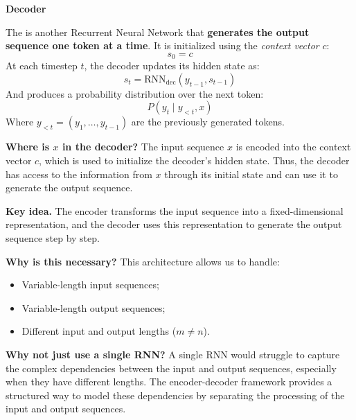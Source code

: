 \highspace
\begin{flushleft}
    \textcolor{Green3}{ \textbf{Decoder}}
\end{flushleft}
The  is another Recurrent Neural Network that \textbf{generates the output sequence one token at a time}. It is initialized using the \emph{context vector} $c$:
\begin{equation*}
    s_{0} = c
\end{equation*}
At each timestep $t$, the decoder updates its hidden state as:
\begin{equation}\label{eq:decoder}
    s_{t} = \text{RNN}_{\text{dec}}\left(y_{t-1}, s_{t-1}\right)
\end{equation}
And produces a probability distribution over the next token:
\begin{equation*}
    P\left(y_t \mid y_{<t}, x\right)
\end{equation*}
Where $y_{<t} = \left(y_1, \dots, y_{t-1}\right)$ are the previously generated tokens.

\highspace
\textcolor{Green3}{ \textbf{Where is $x$ in the decoder?}} The input sequence $x$ is encoded into the context vector $c$, which is used to initialize the decoder's hidden state. Thus, the decoder has access to the information from $x$ through its initial state and can use it to generate the output sequence.

\highspace
\textcolor{Green3}{ \textbf{Key idea.}} The encoder transforms the input sequence into a fixed-dimensional representation, and the decoder uses this representation to generate the output sequence step by step.

\highspace
\textcolor{Green3}{ \textbf{Why is this necessary?}} This architecture allows us to handle:
\begin{itemize}
    \item Variable-length input sequences;
    \item Variable-length output sequences;
    \item Different input and output lengths ($m \neq n$).
\end{itemize}
\textcolor{Green3}{ \textbf{Why not just use a single RNN?}} A single RNN would struggle to capture the complex dependencies between the input and output sequences, especially when they have different lengths. The encoder-decoder framework provides a structured way to model these dependencies by separating the processing of the input and output sequences.

